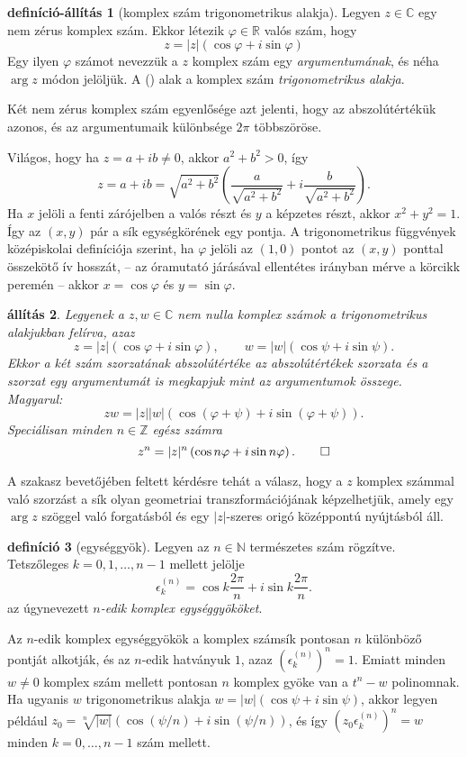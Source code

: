 \documentclass[9pt, a4paper, showtrims]{memoir}
\makeatletter
\renewenvironment{proof}[1][\proofname]
    {\par\pushQED{\qed}%
    \normalfont \topsep6\p@\@plus6\p@\relax
    \trivlist
    \item[\hskip\labelsep
        \itshape
    #1\@addpunct{:}]\ignorespaces}
    {\popQED\endtrivlist\@endpefalse}
\theoremstyle{plain}
\newtheorem{proposition}{állítás}[chapter]
\theoremstyle{remark}
\theoremstyle{definition}
\newtheorem{definition}[proposition]{definíció}
\newtheorem{defprop}[proposition]{definíció-állítás}
\makeatother
\begin{document}
\begin{defprop}[komplex szám trigonometrikus alakja]
	Legyen $z\in \mathbb{C}$ egy nem zérus komplex szám.
	Ekkor létezik $\varphi\in\mathbb{R}$ valós szám, hogy
	\[
		z=
		|z|\left( \cos\varphi+i\sin\varphi \right)\tag{\dag}
	\]
	Egy ilyen $\varphi$ számot nevezzük a $z$ komplex szám egy \emph{argumentumának}, és néha $\arg z$ módon jelöljük.
	A (\dag) alak a komplex szám \emph{trigonometrikus alakja}.

	Két nem zérus komplex szám egyenlősége azt jelenti, hogy az abszolútértékük azonos,
	és az argumentumaik különbsége $2\pi$ többszöröse.
\end{defprop}
\begin{proof}
	Világos, hogy ha $z=a+ib\neq 0$, akkor $a^2+b^2>0$, így
	\[
		z=a+ib
		=
		\sqrt{a^2+b^2}\left( \frac{a}{\sqrt{a^2+b^2}}+i\frac{b}{\sqrt{a^2+b^2}} \right).
	\]
	Ha $x$ jelöli a fenti zárójelben a valós részt és $y$ a képzetes részt,
	akkor $x^2+y^2=1$.
	Így az $\left( x,y \right)$ pár a sík egységkörének egy pontja.
	A trigonometrikus függvények középiskolai definíciója szerint,
	ha $\varphi$ jelöli az $\left( 1,0 \right)$ pontot az $\left( x,y \right)$
	ponttal összekötő ív hosszát, -- az óramutató járásával ellentétes irányban mérve a körcikk peremén --
	akkor $x=\cos\varphi$ és $y=\sin\varphi$.
\end{proof}
\begin{proposition}
	Legyenek a $z,w\in \mathbb{C}$ nem nulla komplex számok a trigonometrikus alakjukban felírva,
	azaz
	\[
		z=|z|\left( \cos\varphi+i\sin\varphi \right),\qquad
		w=|w|\left( \cos\psi+i\sin\psi \right).
	\]
	Ekkor a két szám szorzatának abszolútértéke az abszolútértékek szorzata
	és a szorzat egy argumentumát is megkapjuk mint az argumentumok összege.
	Magyarul:
	\[
		zw=
		|z||w|\left( \cos\left( \varphi+\psi \right)+i\sin\left( \varphi+\psi \right) \right).
	\]
	Speciálisan minden $n\in\mathbb{Z}$ egész számra
	\[
		z^n=|z|^n\left( \cos n\varphi+i\sin n\varphi \right).\qedhere
	\]
\end{proposition}
A szakasz bevetőjében feltett kérdésre tehát a válasz,
hogy a $z$ komplex számmal való szorzást a sík olyan geometriai transzformációjának képzelhetjük,
amely egy $\arg z$ szöggel való forgatásból és egy $|z|$-szeres origó középpontú nyújtásból áll.
\begin{definition}[egységgyök]
	Legyen az $n\in\mathbb{N}$ természetes szám rögzítve.
	Tetszőleges $k=0,1,\ldots,n-1$ mellett jelölje
	\[
		\epsilon_k^{(n)}=\cos k\frac{2\pi}{n}+i\sin k\frac{2\pi}{n}.
	\]
	az úgynevezett \emph{$n$-edik komplex egységgyököket}.
\end{definition}
Az $n$-edik komplex egységgyökök a komplex számsík pontosan $n$ különböző pontját alkotják,
és az $n$-edik hatványuk $1$, azaz
$(\epsilon_k^{(n)})^n=1$.
Emiatt minden $w\neq 0$ komplex szám mellett pontosan $n$ komplex gyöke van a $t^n-w$ polinomnak.
Ha ugyanis $w$ trigonometrikus alakja $w=|w|\left( \cos\psi+i\sin\psi \right)$,
akkor legyen például $z_0=\sqrt[n]{|w|}\left( \cos(\psi/n)+i\sin(\psi/n) \right)$,
és így $(z_0\epsilon_k^{(n)})^n=w$ minden $k=0,\ldots,n-1$ szám mellett.
\end{document}
